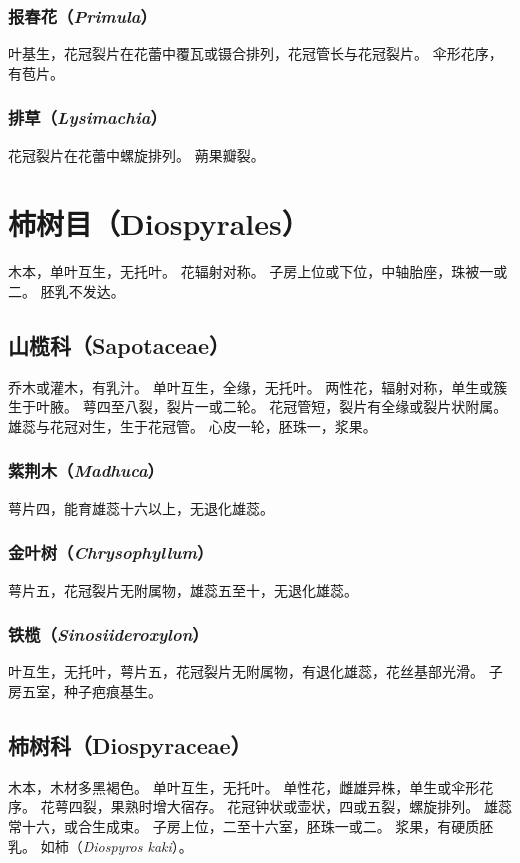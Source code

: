 \documentclass[11pt]{article}
\begin{document}
\begin{sloppypar}
\subsubsection{报春花（\textit{Primula}）}
叶基生，花冠裂片在花蕾中覆瓦或镊合排列，花冠管长与花冠裂片。
伞形花序，有苞片。

\subsubsection{排草（\textit{Lysimachia}）}
花冠裂片在花蕾中螺旋排列。
蒴果瓣裂。
  
\section{柿树目（Diospyrales）}
木本，单叶互生，无托叶。
花辐射对称。
子房上位或下位，中轴胎座，珠被一或二。
胚乳不发达。

\subsection{山榄科（Sapotaceae）}
乔木或灌木，有乳汁。
单叶互生，全缘，无托叶。
两性花，辐射对称，单生或簇生于叶腋。
萼四至八裂，裂片一或二轮。
花冠管短，裂片有全缘或裂片状附属。
雄蕊与花冠对生，生于花冠管。
心皮一轮，胚珠一，浆果。

\subsubsection{紫荆木（\textit{Madhuca}）}
萼片四，能育雄蕊十六以上，无退化雄蕊。

\subsubsection{金叶树（\textit{Chrysophyllum}）}
萼片五，花冠裂片无附属物，雄蕊五至十，无退化雄蕊。

\subsubsection{铁榄（\textit{Sinosiideroxylon}）}
叶互生，无托叶，萼片五，花冠裂片无附属物，有退化雄蕊，花丝基部光滑。
子房五室，种子疤痕基生。

\subsection{柿树科（Diospyraceae）}
木本，木材多黑褐色。
单叶互生，无托叶。
单性花，雌雄异株，单生或伞形花序。
花萼四裂，果熟时增大宿存。
花冠钟状或壶状，四或五裂，螺旋排列。
雄蕊常十六，或合生成束。
子房上位，二至十六室，胚珠一或二。
浆果，有硬质胚乳。
如柿（\textit{Diospyros kaki}）。


\end{sloppypar}
\end{document}

